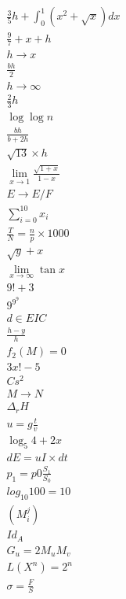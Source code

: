 \documentclass{article}
\begin{document}
\begin{align}
	\frac{3}{5}h+\int_{0}^{1}(x^{2}+\sqrt{x})dx\\
	\frac{9}{7}+x+h\\
	h\rightarrow x\\
	\frac{bh}{2}\\
	h\rightarrow \infty\\
	\frac{2}{3}h\\
	\log\log n\\
	\frac{bh}{b+2h}\\
	\sqrt{13}\times h\\
	\lim_{x\rightarrow 1} \frac{\sqrt{1+x}}{1-x}\\
	E\rightarrow E\slash F\\
	\sum_{i=0}^{10} x_{i}\\
	\frac{T}{N}=\frac{n}{p} \times 1000\\
	\sqrt{y}+x\\
	\lim_{x\rightarrow \infty}\tan x\\
	9!+3\\
	9^{9^{9}}\\
	d\in EIC\\
	\frac{h-y}{h}\\
	f_{2}(M)=0\\
	3x!-5\\
	Cs^{2}\\
	M\rightarrow N\\
	\Delta_r H\\
	u=g\frac{t}{v}\\
	\log_{5}4+2x\\
	dE=uI\times dt\\
	p_{1}=p{0}\frac{S_{1}}{S_{0}}\\
	log_{10}100=10\\
	(M_{i}^{j})\\
	Id_{A}\\
	G_{u}=2M_{u}M_{v}\\
	L(X^{n})=2^{n}\\
	\sigma = \frac{F}{S}\\
\end{align}
\newpage
\end{document}
